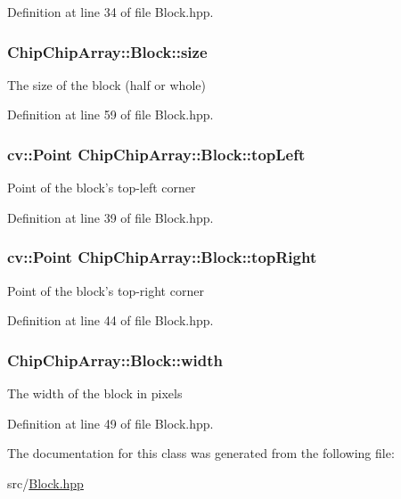 Definition at line 34 of file Block.\+hpp.

\hypertarget{classChipChipArray_1_1Block_aebd356d7fcfe7ff11db8195e6d7f8e42}{
\subsubsection[{size}]{ Chip\+Chip\+Array\+::\+Block\+::size}}\label{classChipChipArray_1_1Block_aebd356d7fcfe7ff11db8195e6d7f8e42}
The size of the block (half or whole) 

Definition at line 59 of file Block.\+hpp.

\hypertarget{classChipChipArray_1_1Block_aeecc05025c6c8e23ff6ca09a6fbd4b4b}{
\subsubsection[{top\+Left}]{\setlength{\rightskip}{0pt plus 5cm}cv\+::\+Point Chip\+Chip\+Array\+::\+Block\+::top\+Left}}\label{classChipChipArray_1_1Block_aeecc05025c6c8e23ff6ca09a6fbd4b4b}
Point of the block's top-\/left corner 

Definition at line 39 of file Block.\+hpp.

\hypertarget{classChipChipArray_1_1Block_aaa4ff82846e95a628800ebdfd3ceefb5}{
\subsubsection[{top\+Right}]{\setlength{\rightskip}{0pt plus 5cm}cv\+::\+Point Chip\+Chip\+Array\+::\+Block\+::top\+Right}}\label{classChipChipArray_1_1Block_aaa4ff82846e95a628800ebdfd3ceefb5}
Point of the block's top-\/right corner 

Definition at line 44 of file Block.\+hpp.

\hypertarget{classChipChipArray_1_1Block_ac3f815e8aa9060c4ad20d4e1b2649e35}{
\subsubsection[{width}]{ Chip\+Chip\+Array\+::\+Block\+::width}}\label{classChipChipArray_1_1Block_ac3f815e8aa9060c4ad20d4e1b2649e35}
The width of the block in pixels 

Definition at line 49 of file Block.\+hpp.



The documentation for this class was generated from the following file\+:\begin{DoxyCompactItemize}
\item 
src/\hyperlink{Block_8hpp}{Block.\+hpp}\end{DoxyCompactItemize}
